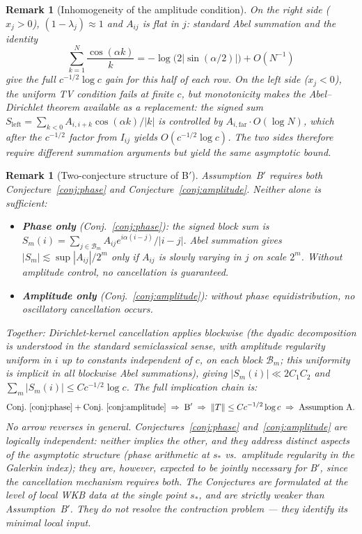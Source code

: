 \documentclass[12pt,a4paper]{article}
\newtheorem{remark}[theorem]{Remark}
\newcommand{\norm}[1]{\left\|#1\right\|}
\begin{document}
\begin{remark}[Inhomogeneity of the amplitude condition]
\label{rem:amplitude_inhom}
On the right side ($x_j>0$), $(1-\lambda_j)\approx 1$ and $A_{ij}$
is flat in $j$: standard Abel summation and the identity
\[
  \sum_{k=1}^N \frac{\cos(\alpha k)}{k}
  = -\log\!\bigl(2|\sin(\alpha/2)|\bigr) + O(N^{-1})
\]
give the full $c^{-1/2}\log c$ gain for this half of each row.
On the left side ($x_j<0$), the uniform TV condition fails at
finite $c$, but monotonicity makes the Abel--Dirichlet theorem
available as a replacement: the signed sum
$S_{\mathrm{left}} = \sum_{k<0} A_{i,i+k}\cos(\alpha k)/|k|$
is controlled by $A_{i,\mathrm{far}} \cdot O(\log N)$, which
after the $c^{-1/2}$ factor from $I_{ij}$ yields $O(c^{-1/2}\log c)$.
The two sides therefore require different summation arguments
but yield the same asymptotic bound.
\end{remark}

\begin{remark}[Two-conjecture structure of B$'$]
\label{rem:Bprime_chain}
Assumption~B$'$ requires both
Conjecture~\ref{conj:phase} and Conjecture~\ref{conj:amplitude}.
Neither alone is sufficient:
\begin{itemize}[nosep]
  \item \textbf{Phase only} (Conj.~\ref{conj:phase}):
        the signed block sum is
        $S_m(i)=\sum_{j\in\mathcal{B}_m}A_{ij}e^{i\alpha(i-j)}/|i-j|$.
        Abel summation gives $|S_m|\lesssim\sup|A_{ij}|/2^m$
        only if $A_{ij}$ is slowly varying in $j$ on scale $2^m$.
        Without amplitude control, no cancellation is guaranteed.
  \item \textbf{Amplitude only} (Conj.~\ref{conj:amplitude}):
        without phase equidistribution, no oscillatory
        cancellation occurs.
\end{itemize}
Together: Dirichlet-kernel cancellation applies blockwise
(the dyadic decomposition is understood in the standard
semiclassical sense, with amplitude regularity uniform in $i$
up to constants independent of $c$, on each block $\mathcal{B}_m$;
this uniformity is implicit in all blockwise Abel summations),
giving $|S_m(i)|\ll 2C_1C_2$ and
$\sum_m|S_m(i)|\leq Cc^{-1/2}\log c$.
The full implication chain is:
\[
  \text{Conj.~\ref{conj:phase}}
  +\text{Conj.~\ref{conj:amplitude}}
  \;\Rightarrow\;
  \text{B$'$}
  \;\Rightarrow\;
  \norm{T}\leq Cc^{-1/2}\log c
  \;\Rightarrow\;
  \text{Assumption~A}.
\]
No arrow reverses in general.
Conjectures~\ref{conj:phase} and~\ref{conj:amplitude} are
\emph{logically independent}: neither implies the other,
and they address distinct aspects of the asymptotic structure
(phase arithmetic at $s_*$ vs.\ amplitude regularity in the Galerkin
index); they are, however, expected to be jointly necessary for B$'$,
since the cancellation mechanism requires both.
The Conjectures are formulated at the level of local WKB data
at the single point $s_*$, and are strictly weaker than
Assumption~B$'$.
They do not resolve the contraction problem ---
they identify its minimal local input.
\end{remark}
\end{document}
